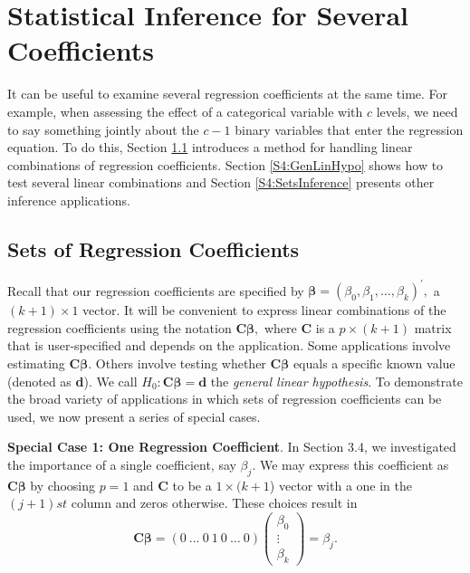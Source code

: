 \linejed

\section{Statistical Inference for Several
Coefficients}\label{S4:SeveralCoeff}

It can be useful to examine several regression coefficients at the
same time. For example, when assessing the effect of a categorical
variable with $c$ levels, we need to say something jointly about the
$c-1$ binary variables that enter the regression equation. To do
this, Section \ref{S4:SetsRegCoeff} introduces a method for handling
linear combinations of regression coefficients. Section
\ref{S4:GenLinHypo} shows how to test several linear combinations
and Section \ref{S4:SetsInference} presents other inference
applications.


\subsection{Sets of Regression Coefficients}\label{S4:SetsRegCoeff}

Recall that our regression coefficients are specified by
$\boldsymbol \beta =\left( \beta_0, \beta_1, \ldots,\beta_k \right)
^{\prime},$ a $(k+1)\times 1$ vector. It will be convenient to
express linear combinations of the regression coefficients using the
notation $\mathbf{C} \boldsymbol \beta,$ where \textbf{C} is a
$p\times (k+1)$ matrix that is user-specified  and depends on the
application. Some applications involve estimating $\mathbf{C}
\boldsymbol \beta$. Others involve testing whether $\mathbf{C}
\boldsymbol \beta$ equals a specific known value (denoted as
\textbf{d}). We call $H_0:\mathbf{C \boldsymbol \beta =d}$ the
\emph{general linear hypothesis}. To demonstrate the broad variety
of applications in which sets of regression coefficients can be
used, we now present a series of special cases.


\textbf{Special Case 1: One Regression Coefficient}. In Section 3.4,
we investigated the importance of a single coefficient, say
$\beta_j.$ We may express this coefficient as $\mathbf{C}
\boldsymbol \beta$ by choosing $p=1$ and \textbf{C} to be a $1\times
(k+1$) vector with a one in the $(j+1)st$ column and zeros
otherwise. These choices result in
\begin{equation*}
\mathbf{C \boldsymbol \beta =}\left( 0~\ldots~0~1~0~\ldots~0\right)
\left(
\begin{array}{c}
\beta_0 \\
\vdots  \\
\beta_k%
\end{array}
\right) =\beta_j.
\end{equation*}

